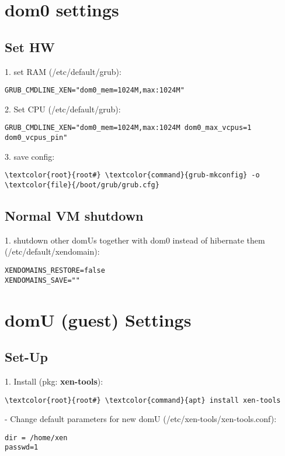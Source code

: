 \documentclass[10pt, a4paper, onecolumn, openany]{book} %
\begin{document}
\section{dom0 settings}
\subsection{Set HW}
1. set RAM (\textcolor{file}{/etc/default/grub}):
\begin{Verbatim}[commandchars=\\\{\}]
GRUB_CMDLINE_XEN="dom0_mem=1024M,max:1024M"
\end{Verbatim}
2. Set CPU (\textcolor{file}{/etc/default/grub}):
\begin{Verbatim}[commandchars=\\\{\}]
GRUB_CMDLINE_XEN="dom0_mem=1024M,max:1024M dom0_max_vcpus=1 dom0_vcpus_pin"
\end{Verbatim}
3. save config:
\begin{Verbatim}[commandchars=\\\{\}]
    \textcolor{root}{root#} \textcolor{command}{grub-mkconfig} -o \textcolor{file}{/boot/grub/grub.cfg}
\end{Verbatim}
\subsection{Normal VM shutdown}
1. shutdown other domUs together with dom0 instead of hibernate them (\textcolor{file}{/etc/default/xendomain}):
\begin{Verbatim}[commandchars=\\\{\}]
XENDOMAINS_RESTORE=false
XENDOMAINS_SAVE=""
\end{Verbatim}

\section{domU (guest) Settings}
\subsection{Set-Up}
1. Install (pkg: \textbf{xen-tools}):
\begin{Verbatim}[commandchars=\\\{\}]
    \textcolor{root}{root#} \textcolor{command}{apt} install xen-tools
\end{Verbatim}
- Change default parameters for new domU (\textcolor{file}{/etc/xen-tools/xen-tools.conf}):
\begin{Verbatim}[commandchars=\\\{\}]
dir = /home/xen
passwd=1
\end{Verbatim}
\end{document}
